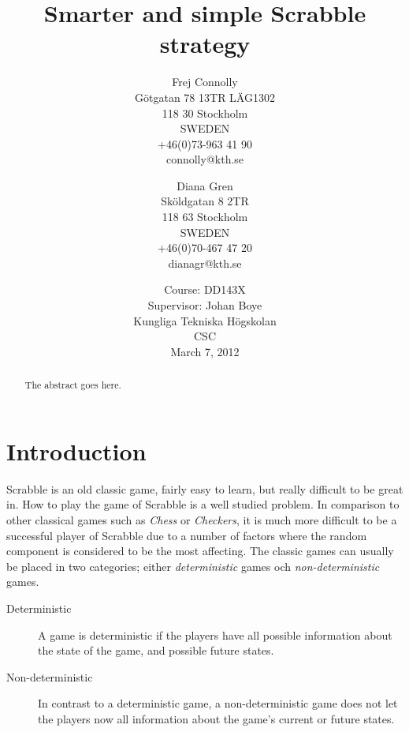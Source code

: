\documentclass[a4paper, 12pt]{report}
\begin{document}
\graphicspath{{./images/}}
\title{Smarter and simple Scrabble strategy}
\date{Course: DD143X \\ Supervisor: Johan Boye \\ Kungliga Tekniska Högskolan \\ CSC \\ March 7, 2012}
\author{Frej Connolly \\ Götgatan 78 13TR LÄG1302 \\ 118 30 Stockholm \\ SWEDEN \\ +46(0)73-963 41 90 \\ connolly@kth.se \\
        \and Diana Gren \\ Sköldgatan 8 2TR \\ 118 63 Stockholm \\ SWEDEN \\ +46(0)70-467 47 20 \\ dianagr@kth.se}

\maketitle
\begin{abstract}
The abstract goes here.
\end{abstract}
\tableofcontents





\chapter{Introduction}
Scrabble is an old classic game, fairly easy to learn, but really difficult to be great in. How to play the game of Scrabble is a well studied problem. In comparison to other classical games such as \emph{Chess} or \emph{Checkers}, it is much more difficult to be a successful player of Scrabble due to a number of factors where the random component is considered to be the most affecting. The classic games can usually be placed in two categories; either \emph{deterministic} games och \emph{non-deterministic} games.

\begin{description}
\item[Deterministic] A game is deterministic if the players have all possible information about the state of the game, and possible future states.
\item[Non-deterministic] In contrast to a deterministic game, a non-deterministic game does not let the players now all information about the game's current or future states.
\end{description}
\end{document}
